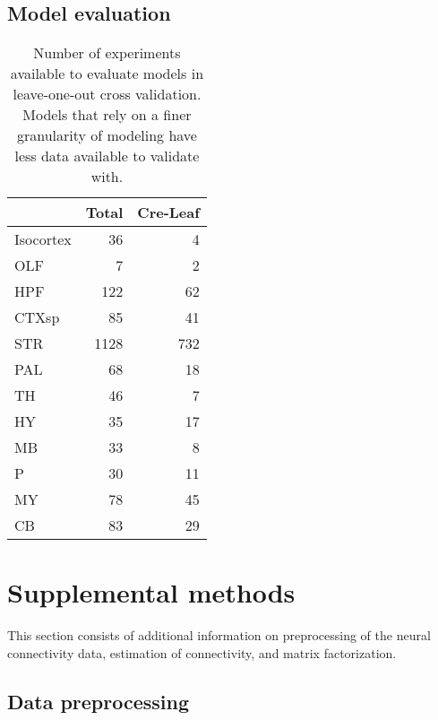 \subsection{Model evaluation}
\label{supp_sec:model-evaluation}

\begin{table}[H]
\small
\begin{tabular}{lrr}
\toprule
{} &  Total &  Cre-Leaf \\
\midrule
Isocortex &     36 &         4 \\
OLF       &      7 &         2 \\
HPF       &    122 &        62 \\
CTXsp     &     85 &        41 \\
STR       &   1128 &       732 \\
PAL       &     68 &        18 \\
TH        &     46 &         7 \\
HY        &     35 &        17 \\
MB        &     33 &         8 \\
P         &     30 &        11 \\
MY        &     78 &        45 \\
CB        &     83 &        29 \\
\bottomrule
\end{tabular}
\caption{Number of experiments available to evaluate models in leave-one-out cross validation. 
Models that rely on a finer granularity of modeling have less data available to validate with.} 
\label{tab:eval_size}
\end{table}

\newpage 
\section{Supplemental methods}
\label{supp_sec:methods}

This section consists of additional information on preprocessing of the neural connectivity data, estimation of connectivity, and matrix factorization.

\subsection{Data preprocessing}
\label{supp_sec:dp}


